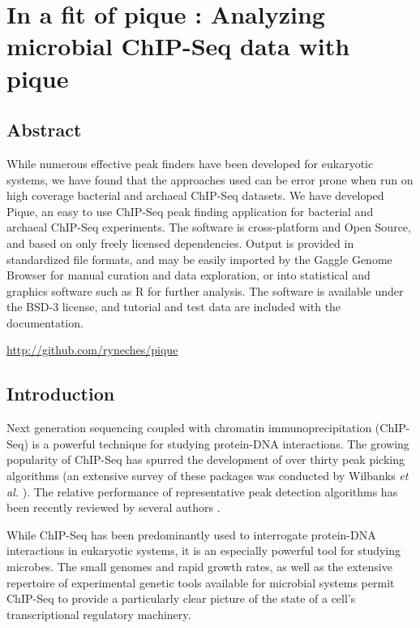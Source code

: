 \chapter{In a fit of pique : Analyzing microbial ChIP-Seq data with pique}


\section{Abstract}

While numerous effective peak finders have been developed
for eukaryotic systems, we have found that the approaches used can be
error prone when run on high coverage bacterial and archaeal ChIP-Seq
datasets. We have developed Pique, an easy to use ChIP-Seq peak
finding application for bacterial and archaeal ChIP-Seq experiments.
The software is cross-platform and Open Source, and based on only
freely licensed dependencies. Output is provided in standardized file
formats, and may be easily imported by the Gaggle Genome Browser
\cite{gaggle_browser} for manual curation and data exploration, or
into statistical and graphics software such as R \cite{R} for further
analysis. The software is available under the BSD-3 license, and tutorial
and test data are included with the documentation.

\url{http://github.com/ryneches/pique}

\section{Introduction}

Next generation sequencing coupled with chromatin
immuno\-pre\-cipi\-tation (ChIP-Seq) is a powerful technique for
studying protein-DNA interactions. The growing popularity of ChIP-Seq
has spurred the development of over thirty peak picking algorithms (an
extensive survey of these packages was conducted by Wilbanks {\em et
  al.} \cite{wilbanks}). The relative performance of representative
peak detection algorithms has been recently reviewed by several
authors \cite{Pepke, Laajala_review, too_many_peak_callers,
  peakranger, peak_benchmark}.

While ChIP-Seq has been predominantly used to interrogate protein-DNA
interactions in eukaryotic systems, it is an especially powerful tool
for studying microbes. The small genomes and rapid growth rates, as
well as the extensive repertoire of experimental genetic tools
available for microbial systems permit ChIP-Seq to provide a
particularly clear picture of the state of a cell's transcriptional
regulatory machinery.

